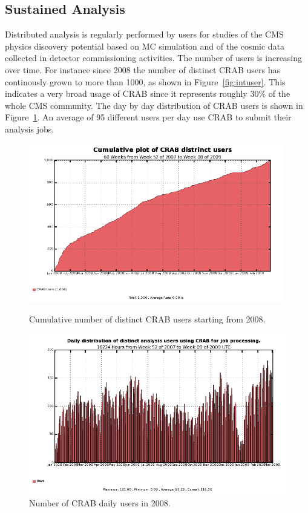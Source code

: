 \subsection{Sustained Analysis}
\label{sec:5_2}

Distributed analysis is regularly performed by users for studies of the CMS physics discovery potential based on MC simulation and of the cosmic data collected in detector commissioning activities.
The number of users is increasing over time. For instance since 2008 the number of distinct CRAB users has continously grown to more than 1000, as shown in Figure~\ref{fig:intuser}. This indicates a very broad usage of CRAB since it represents roughly 30\% of the whole CMS community.
The day by day distribution of CRAB users is shown in Figure~\ref{fig:distusers}. An average of 95 different users per day use CRAB to submit their analysis 
jobs. 

\begin{figure}
\begin{minipage}{.48\textwidth}
\centering
\includegraphics[width=0.99\textwidth]{figures/UserInteg.png}
\caption{Cumulative number of distinct CRAB users starting from 2008. }
\label{fig:intuser}
\end{minipage}
\begin{minipage}{.48\textwidth}
\centering
\includegraphics[width=1.2\textwidth]{figures/crabusersdaily.png}
\caption{Number of CRAB daily users in 2008. }
\label{fig:distusers}
\end{minipage}
\end{figure}


